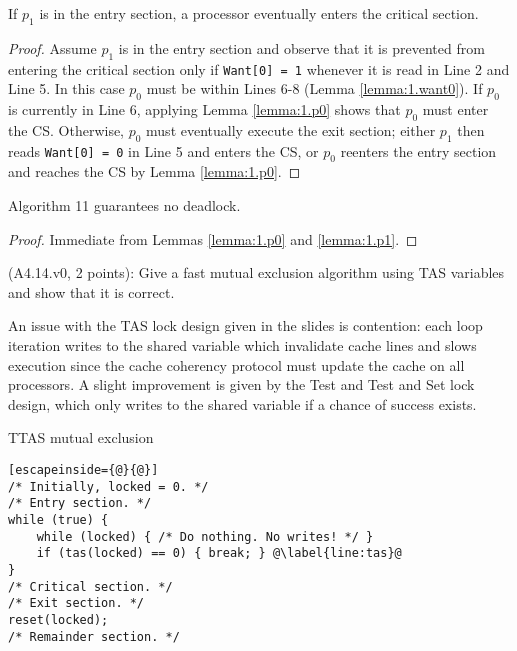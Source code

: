 \begin{lemma} \label{lemma:1.p1}
If $p_1$ is in the entry section, a processor eventually enters the critical section.
\end{lemma}

\begin{proof}
Assume $p_1$ is in the entry section and observe that it
is prevented from entering the critical section only if \lstinline|Want[0] = 1|
whenever it is read in Line 2 and Line 5. In this case $p_0$ must be within Lines
6-8 (Lemma \ref{lemma:1.want0}). If $p_0$ is currently in Line 6, applying Lemma
\ref{lemma:1.p0} shows that $p_0$ must enter the CS. Otherwise, $p_0$ must
eventually execute the exit section; either $p_1$ then reads \lstinline|Want[0] = 0|
in Line 5 and enters the CS, or $p_0$ reenters the entry section and reaches the
CS by Lemma \ref{lemma:1.p0}.

\end{proof}


\begin{theorem}
Algorithm 11 guarantees no deadlock.
\end{theorem}

\begin{proof}
Immediate from Lemmas \ref{lemma:1.p0} and \ref{lemma:1.p1}.
\end{proof}


\begin{Exc}{(A4.14.v0, 2 points):}
Give a fast mutual exclusion algorithm using TAS variables and
show that it is correct.
\end{Exc}

An issue with the TAS lock design given in the slides is contention:
each loop iteration writes to the shared variable which invalidate cache lines
and slows execution since the cache coherency protocol must update the cache
on all processors. A slight improvement is given by the Test and Test and Set
lock design, which only writes to the shared variable if a chance of success
exists.

\begin{algorithm}
\caption{TTAS mutual exclusion} \label{alg:ttas}
\begin{lstlisting}[escapeinside={@}{@}]
/* Initially, locked = 0. */
/* Entry section. */
while (true) {
    while (locked) { /* Do nothing. No writes! */ }
    if (tas(locked) == 0) { break; } @\label{line:tas}@
}
/* Critical section. */
/* Exit section. */
reset(locked);
/* Remainder section. */
\end{lstlisting}
\end{algorithm}

